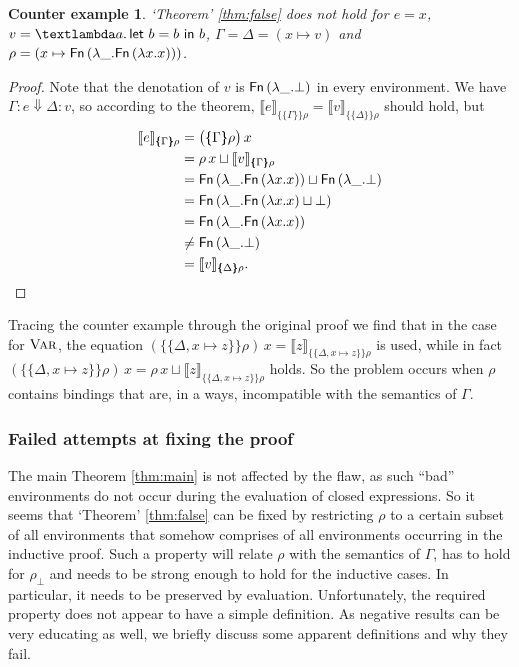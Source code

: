 \documentclass{scrartcl}
\newtheorem{counterexample}[theorem]{Counter example}
\theoremstyle{nonumberbreak}
\newtheorem{proof}{Proof}
\newcommand{\sFn}[1]{\text{\textsf{Fn}}\,(#1)}
\newcommand{\sLam}[2]{\text{\textlambda} #1.\, #2}
\newcommand{\sLet}[2]{\text{\textsf{let}}\ #1\ \text{\textsf{in}}\ #2}
\newcommand{\sred}[4]{#1 : #2 \Downarrow #3 : #4}
\newcommand{\sRule}[1]{\text{{\textsc{#1}}}}
\newcommand{\dsem}[2]{\llbracket #1 \rrbracket_{#2}}
\newcommand{\esem}[1]{\{\!\!\!\{#1\}\!\!\!\}}
\begin{document}
\begin{counterexample}
`Theorem' \ref{thm:false} does not hold for $e = x$, $v = \sLam{a}{\sLet{b = b}b}$, $\Gamma = \Delta = (x \mapsto v)$ and $\rho = (x \mapsto \sFn{\lambda \_. \sFn{\lambda x.x}})$. 
\end{counterexample}

\begin{proof}
Note that the denotation of $v$ is $\sFn{\lambda \_. \bot}$ in every environment. We have $\sred\Gamma e\Delta v$, so according to the theorem, $\dsem{e}{\esem{\Gamma}{\rho}} = \dsem{v}{\esem{\Delta}{\rho}}$ should hold, but
\begin{align*}
\dsem{e}{\esem\Gamma\rho}
&= \big(\esem \Gamma\rho\big)\,x \\
&= \rho\,x \sqcup \dsem{v}{\esem{\Gamma}\rho}\\
&= \sFn{\lambda \_. \sFn{\lambda x.x}} \sqcup \sFn{\lambda \_. \bot} \\
&= \sFn{\lambda \_. \sFn{\lambda x.x} \sqcup \bot} \\
&= \sFn{\lambda \_. \sFn{\lambda x.x}} \\
& \ne \sFn{\lambda \_. \bot} \\
&= \dsem{v}{\esem{\Delta}{\rho}}.
\end{align*}
\end{proof}

Tracing the counter example through the original proof we find that in the case for $\sRule{Var}$, the equation $({\esem{\Delta, x\mapsto z}\rho})\, x = \dsem{z}{\esem{\Delta, x\mapsto z}\rho}$ is used, while in fact $({\esem{\Delta, x\mapsto z}\rho})\, x = \rho\, x \sqcup \dsem{z}{\esem{\Delta, x\mapsto z}\rho}$ holds. So the problem occurs when $\rho$ contains bindings that are, in a ways, incompatible with the semantics of $\Gamma$.

\subsubsection{Failed attempts at fixing the proof}

The main Theorem \ref{thm:main} is not affected by the flaw, as such “bad” environments do not occur during the evaluation of closed expressions. So it seems that `Theorem' \ref{thm:false} can be fixed by restricting $\rho$ to a certain subset of all environments that somehow comprises of all environments occurring in the inductive proof. Such a property will relate $\rho$ with the semantics of $\Gamma$, has to hold for $\rho_\bot$ and needs to be strong enough to hold for the inductive cases. In particular, it needs to be preserved by evaluation. Unfortunately, the required property does not appear to have a simple definition. As negative results can be very educating as well, we briefly discuss some apparent definitions and why they fail.
\end{document}
